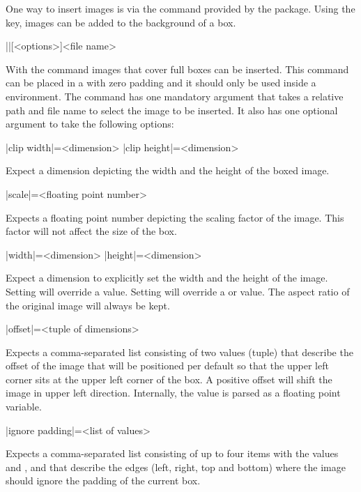\documentclass[a4paper]{article}
\begin{document}
One way to insert images is via the  command provided by the  package. Using the  key, images can be added to the background of a box.

\begin{macrodef}
|\leporelloimage|[<options>]{<file name>}
\end{macrodef}
With the command \macro{\leporelloimage} images that cover full boxes can be inserted. This command can be placed in a  with zero padding and it should only be used inside a  environment. The command has one mandatory argument that takes a relative path and file name to select the image to be inserted. It also has one optional argument to take the following options:

\begin{macrodef}
|clip width|={<dimension>}
|clip height|={<dimension>}
\end{macrodef}
Expect a dimension depicting the width and the height of the boxed image.

\begin{macrodef}
|scale|={<floating point number>}
\end{macrodef}
Expects a floating point number depicting the scaling factor of the image. This factor will not affect the size of the box.

\begin{macrodef}
|width|={<dimension>}
|height|={<dimension>}
\end{macrodef}
Expect a dimension to explicitly set the width and the height of the image. Setting  will override a  value. Setting  will override a  or  value. The aspect ratio of the original image will always be kept.

\begin{macrodef}
|offset|={<tuple of dimensions>}
\end{macrodef}
Expects a comma-separated list consisting of two values (tuple) that describe the offset of the image that will be positioned per default so that the upper left corner sits at the upper left corner of the box. A positive offset will shift the image in upper left direction. Internally, the value is parsed as a floating point variable.

\begin{macrodef}
|ignore padding|={<list of values>}
\end{macrodef}
Expects a comma-separated list consisting of up to four items with the values  and ,  and  that describe the edges (left, right, top and bottom) where the image should ignore the padding of the current box.
\end{document}
